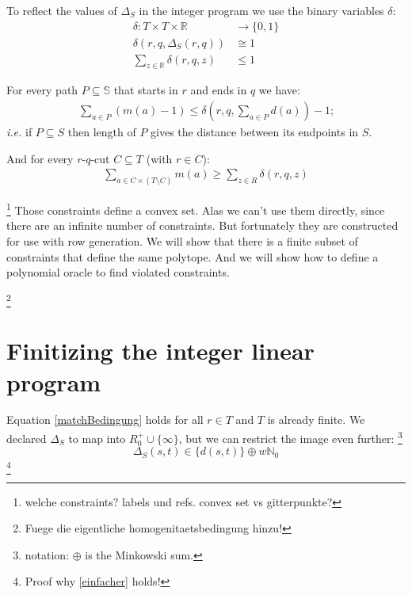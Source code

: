 \documentclass[a4paper]{amsart} %
\def\ie{\emph{i.e.}}
\newcommand{\todo}[1]{\footnote{#1}}
\begin{document}
To reflect the values of \(\Delta_S\) in the integer program we use the binary variables \(\delta\):
\begin{align}
  \delta \colon T \times T \times \mathbb{R} & \to \{0,1\} \\
  \delta\left(r, q, \Delta_S\left(r,q\right)\right) &\cong 1 \\
  \label{onlyOne}
  \sum_{z \in \mathbb{R}} \delta(r, q, z) &\leq 1
\end{align}

For every path \(P \subseteq \mathbb{S}\) that starts in \(r\) and ends in \(q\) we have:
\begin{align}
\label{zwingHoch}
\sum_{a \in P} (m(a) - 1) \leq \delta \left(r,q, \sum_{a \in P} d \left(a\right)\right) - 1 \textrm{;}
\end{align}
\ie{} if \(P \subseteq S\) then length of \(P\) gives
the distance between its endpoints in \(S\).

And for every \(r\)-\(q\)-cut \(C \subseteq T\) (with \(r \in C\)):
\begin{align}
\label{zwingRunter}
  \sum_{a \in C \times (T \setminus C)} m(a) \geq \sum_{z \in R} \delta (r,q, z)
\end{align}





\todo{welche constraints?  labels und refs.  convex set vs gitterpunkte?}
Those constraints define a convex set.  Alas we can't use them
directly, since there are an infinite number of constraints.  But
fortunately they are constructed for use with row generation.  We will
show that there is a finite subset of constraints that define the same
polytope.  And we will show how to define a polynomial oracle to find
violated constraints.

\todo{Fuege die eigentliche homogenitaetsbedingung hinzu!}

\section{Finitizing the integer linear program}

Equation \ref{matchBedingung} holds for all \(r \in T\) and \(T\) is
already finite.  We declared \(\Delta_S\) to map into \(R^+_0 \cup
\{\infty\}\), but we can restrict the image even further:
\todo{notation: \(\oplus\) is the Minkowski sum.}
\begin{equation}
\label{einfacher}
\Delta_S (s,t) \in \{d (s,t)\} \oplus w \mathbb{N}_0
\end{equation}
\todo{Proof why \ref{einfacher} holds!}
\end{document}
